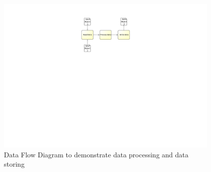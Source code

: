 \begin{figure}[h!]
	\centering
	\includegraphics[width=11cm, trim={10cm 14.0cm 10cm 1.9cm}]{img/ProcessDataDFD.pdf}
	\caption{Data Flow Diagram to demonstrate data processing and data storing}
	\label{fig:ExampleDataProcessing}
\end{figure}

